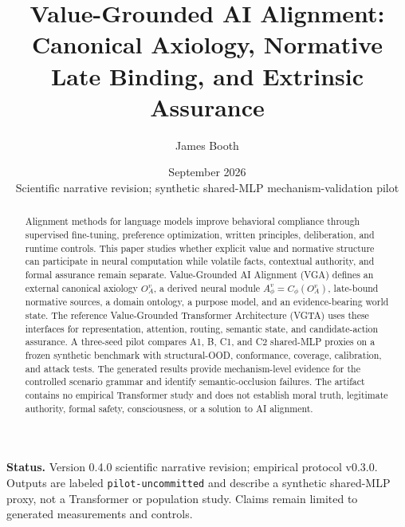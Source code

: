 \documentclass[11pt]{article}
\title{Value-Grounded AI Alignment: Canonical Axiology, Normative Late Binding, and Extrinsic Assurance}
\author{James Booth}
\date{September 2026\\[2mm]\small Scientific narrative revision; synthetic shared-MLP mechanism-validation pilot}
\begin{document}
\maketitle

\begin{abstract}
Alignment methods for language models improve behavioral compliance through supervised fine-tuning, preference optimization, written principles, deliberation, and runtime controls. This paper studies whether explicit value and normative structure can participate in neural computation while volatile facts, contextual authority, and formal assurance remain separate. Value-Grounded AI Alignment (VGA) defines an external canonical axiology $O_A^v$, a derived neural module $A_\phi^v=C_\phi(O_A^v)$, late-bound normative sources, a domain ontology, a purpose model, and an evidence-bearing world state. The reference Value-Grounded Transformer Architecture (VGTA) uses these interfaces for representation, attention, routing, semantic state, and candidate-action assurance. A three-seed pilot compares A1, B, C1, and C2 shared-MLP proxies on a frozen synthetic benchmark with structural-OOD, conformance, coverage, calibration, and attack tests. The generated results provide mechanism-level evidence for the controlled scenario grammar and identify semantic-occlusion failures. The artifact contains no empirical Transformer study and does not establish moral truth, legitimate authority, formal safety, consciousness, or a solution to AI alignment.
\end{abstract}

\noindent\textbf{Status.} Version 0.4.0 scientific narrative revision; empirical protocol v0.3.0. Outputs are labeled \texttt{pilot-uncommitted} and describe a synthetic shared-MLP proxy, not a Transformer or population study. Claims remain limited to generated measurements and controls.











\appendix



\small

\end{document}
